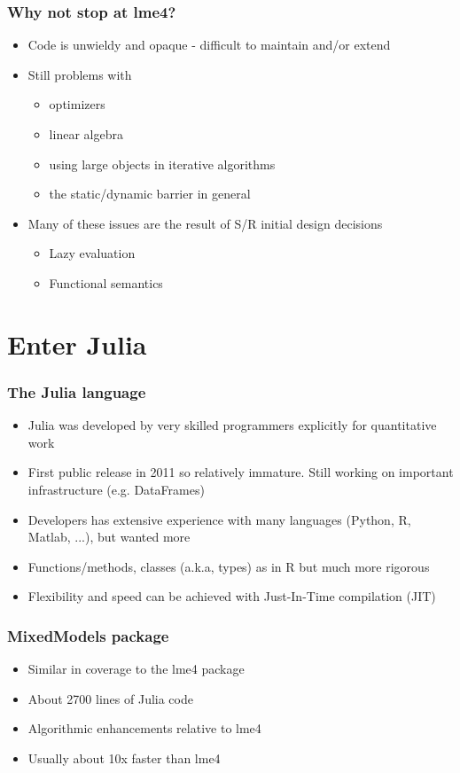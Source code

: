 \documentclass[pdf]{beamer}
\begin{document}
  \begin{frame}\frametitle{Why not stop at lme4?}
    \begin{itemize}
      \pause
      \item Code is unwieldy and opaque - difficult to maintain and/or extend
      \pause
      \item Still problems with
      \pause
      \begin{itemize}
        \item optimizers
        \item linear algebra
        \item using large objects in iterative algorithms
        \item the static/dynamic barrier in general
      \end{itemize}
      \pause
      \item Many of these issues are the result of S/R initial design decisions
      \begin{itemize}
        \item Lazy evaluation
        \item Functional semantics
      \end{itemize}
    \end{itemize}
  \end{frame}

  \section{Enter Julia}

  \begin{frame}\frametitle{The Julia language}
    \begin{itemize}
      \pause
      \item Julia was developed by very skilled programmers explicitly for quantitative work
      \pause
      \item First public release in 2011 so relatively immature.  Still working on important infrastructure (e.g. DataFrames)
      \pause
      \item Developers has extensive experience with many languages (Python, R, Matlab, ...), but wanted more
      \item Functions/methods, classes (a.k.a, types) as in R but much more rigorous
      \item Flexibility and speed can be achieved with Just-In-Time compilation (JIT)
    \end{itemize}
  \end{frame}

  \begin{frame}\frametitle{MixedModels package}
  \begin{itemize}
    \item Similar in coverage to the lme4 package
    \item About 2700 lines of Julia code
    \item Algorithmic enhancements relative to lme4
    \item Usually about 10x faster than lme4
  \end{itemize}

  \end{frame}
\end{document}
